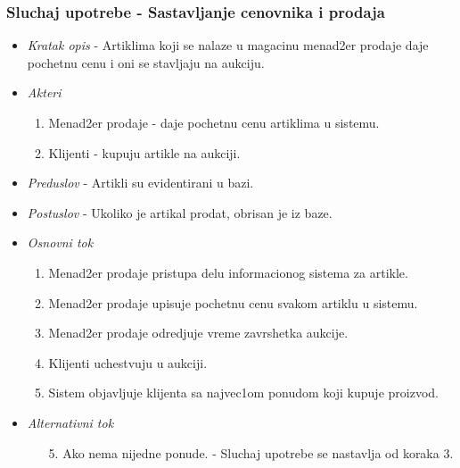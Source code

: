 \documentclass[10 pt]{article}
\begin{document}
	\subsubsection{Sluchaj upotrebe - Sastavljanje cenovnika i prodaja}
	
		\begin{itemize}
			\item\textit{Kratak opis} - Artiklima koji se nalaze u magacinu menad2er prodaje daje pochetnu cenu i oni se stavljaju na aukciju. 
			
			\item\textit{Akteri}
				\begin{enumerate}
					\item Menad2er prodaje - daje pochetnu cenu artiklima u sistemu.
					\item Klijenti - kupuju artikle na aukciji.
				\end{enumerate}

			
			\item\textit{Preduslov} - Artikli su evidentirani u bazi. 
			
			\item\textit{Postuslov} - Ukoliko je artikal prodat, obrisan je iz baze.

			
			\item\textit{Osnovni tok}
			\begin{enumerate}
				\item Menad2er prodaje pristupa delu informacionog sistema za artikle.
				\item Menad2er prodaje upisuje pochetnu cenu svakom artiklu u sistemu.

				\item Menad2er prodaje odredjuje vreme zavrshetka aukcije.

				\item Klijenti uchestvuju u aukciji.

				\item Sistem objavljuje klijenta sa najvec1om ponudom koji kupuje proizvod.
			\end{enumerate} 

			
			\item\textit{Alternativni tok}
			\begin{enumerate}
				\item [5.] Ako nema nijedne ponude. - Sluchaj upotrebe se nastavlja od koraka 3.
			\end{enumerate}
			
		\end{itemize}
	
\end{document}
